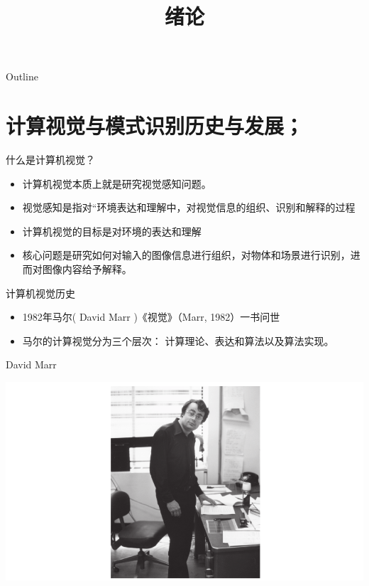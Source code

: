 \documentclass[presentation]{beamer}
\date{}
\title{绪论}
\begin{document}
\maketitle
\begin{frame}{Outline}
\tableofcontents
\end{frame}









\section{计算视觉与模式识别历史与发展；}
\label{sec:org75751dc}

\begin{frame}[label={sec:orgaf7cadf}]{什么是计算机视觉？}
\begin{itemize}
\item 计算机视觉本质上就是研究视觉感知问题。
\item 视觉感知是指对“环境表达和理解中，对视觉信息的组织、识别和解释的过程
\item 计算机视觉的目标是对环境的表达和理解
\item 核心问题是研究如何对输入的图像信息进行组织，对物体和场景进行识别，进而对图像内容给予解释。
\end{itemize}
\end{frame}

\begin{frame}[label={sec:org07d505f}]{计算机视觉历史}
\begin{itemize}
\item 1982年马尔( David Marr )《视觉》（Marr, 1982）一书问世
\item 马尔的计算视觉分为三个层次： 计算理论、表达和算法以及算法实现。
\end{itemize}
\end{frame}

\begin{frame}[label={sec:orgf427d24}]{David Marr}
\begin{center}
\includegraphics[width=.9\linewidth]{./image/David Marr at MIT.png}
\end{center}
\end{frame}
\end{document}
